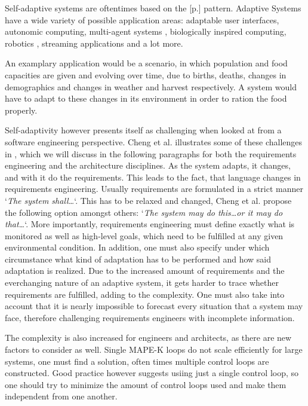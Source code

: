     \quad Self-adaptive systems are oftentimes based on the  [p.\pageref{sub:mape}] pattern.
    Adaptive Systems have a wide variety of possible application areas: adaptable user interfaces, autonomic computing, multi-agent systems \cite{Cheng:2009:SES:1573856.1573858}, 
    biologically inspired computing, robotics \cite{10.1007/978-3-319-59480-4_44}, streaming applications and a lot more.

    \quad An examplary application would be a scenario, in which population and food capacities are given and evolving over time, due to births, deaths, changes in demographics 
    and changes in weather and harvest respectively. A system would have to adapt to these changes in its environment in order to ration the food properly.

    \quad Self-adaptivity however presents itself as challenging when looked at from a software engineering perspective.
    Cheng et al. illustrates some of these challenges in \cite{Cheng:2009:SES:1573856.1573858}, which we will discuss in the following paragraphs for both the 
    requirements engineering and the architecture disciplines.
    As the system adapts, it changes, and with it do the requirements. This leads to the fact, that language changes in requirements engineering.
    Usually requirements are formulated in a strict manner `\textit{The system shall\ldots}`. This has to be relaxed and changed, Cheng et al. propose the following 
    option amongst others: `\textit{The system may do this\ldots or it may do that\ldots}`.
    More importantly, requirements engineering must define exactly what is monitored as well as high-level goals, which need to be fulfilled at any given environmental condition.
    In addition, one must also specify under which circumstance what kind of adaptation has to be performed and how said adaptation is realized.
    Due to the increased amount of requirements and the everchanging nature of an adaptive system, it gets harder to trace whether requirements are fulfilled, adding to the complexity.
    One must also take into account that it is nearly impossible to forecast every situation that a system may face, therefore challenging requirements engineers with incomplete information.

    \quad The complexity is also increased for engineers and architects, as there are new factors to consider as well.
    Single MAPE-K loops do not scale efficiently for large systems, one must find a solution, often times multiple control loops are constructed.
    Good practice however suggests usiing just a single control loop\cite{accidents}, so one should try to minimize the amount of control loops used and
    make them independent from one another.
    
